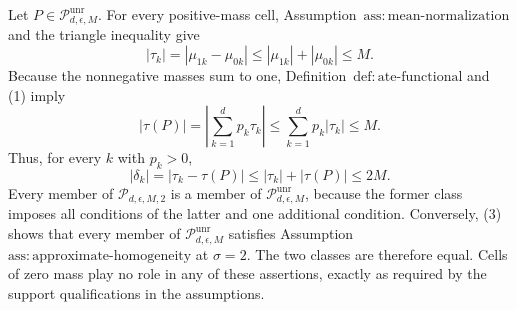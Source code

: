 Let \(P\in\mathcal P_{d,\epsilon,M}^{\mathrm{unr}}\).  For every positive-mass cell, Assumption~\(\mathrm{ass:mean\text{-}normalization}\) and the triangle inequality give
\[
 |\tau_k|=|\mu_{1k}-\mu_{0k}|
 \le |\mu_{1k}|+|\mu_{0k}|
 \le M.
\tag{1}
\]
Because the nonnegative masses sum to one, Definition~\(\mathrm{def:ate\text{-}functional}\) and (1) imply
\[
 |\tau(P)|=\left|\sum_{k=1}^d p_k\tau_k\right|
 \le \sum_{k=1}^d p_k|\tau_k|
 \le M.
\tag{2}
\]
Thus, for every \(k\) with \(p_k>0\),
\[
 |\delta_k|=|\tau_k-\tau(P)|
 \le |\tau_k|+|\tau(P)|
 \le 2M.
\tag{3}
\]
Every member of \(\mathcal P_{d,\epsilon,M,2}\) is a member of \(\mathcal P_{d,\epsilon,M}^{\mathrm{unr}}\), because the former class imposes all conditions of the latter and one additional condition.  Conversely, (3) shows that every member of \(\mathcal P_{d,\epsilon,M}^{\mathrm{unr}}\) satisfies Assumption~\(\mathrm{ass:approximate\text{-}homogeneity}\) at \(\sigma=2\).  The two classes are therefore equal.  Cells of zero mass play no role in any of these assertions, exactly as required by the support qualifications in the assumptions.
